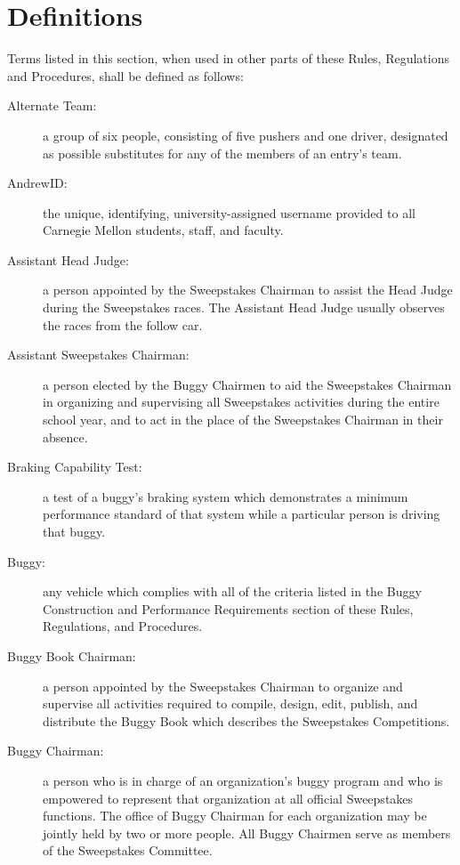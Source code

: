 \chapter{Definitions}

Terms listed in this section, when used in other parts of these Rules,
 Regulations and Procedures, shall be defined as follows:

\begin{description}

	\item[Alternate Team:]
	a group of six people, consisting of five pushers and one driver, designated as possible substitutes for any of the members of an entry's team.

	\item[AndrewID:]
	the unique, identifying, university-assigned username provided to all Carnegie Mellon students, staff, and faculty.

	\item[Assistant Head Judge:]
	a person appointed by the Sweepstakes Chairman to assist the Head Judge during the Sweepstakes races. The Assistant Head Judge usually observes the races from the follow car.

	\item[Assistant Sweepstakes Chairman:]
	a person elected by the Buggy Chairmen to aid the Sweepstakes Chairman in organizing and supervising all Sweepstakes activities during the entire school year, and to act in the place of the Sweepstakes Chairman in their absence.

	\item[Braking Capability Test:]
	a test of a buggy's braking system which demonstrates a minimum performance standard of that system while a particular person is driving that buggy.

	\item[Buggy:]
	any vehicle which complies with all of the criteria listed in the Buggy Construction and Performance Requirements section of these Rules, Regulations, and Procedures.

	\item[Buggy Book Chairman:]
	a person appointed by the Sweepstakes Chairman to organize and supervise all activities required to compile, design, edit, publish, and distribute the Buggy Book which describes the Sweepstakes Competitions.

	\item[Buggy Chairman:]
	a person who is in charge of an organization's buggy program and who is empowered to represent that organization at all official Sweepstakes functions. The office of Buggy Chairman for each organization may be jointly held by two or more people. All Buggy Chairmen serve as members of the Sweepstakes Committee.


\end{description}
